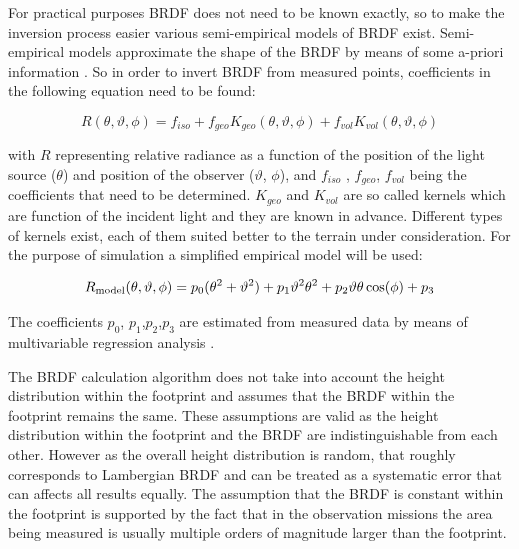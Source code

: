 For practical purposes \ac{BRDF} does not need to be known exactly, so to make the inversion process easier various semi-empirical models of \ac{BRDF} exist. Semi-empirical models approximate the shape of the \ac{BRDF} by means of some a-priori information \cite{BRDFwanner}. So in order to invert \ac{BRDF} from measured points, coefficients in the following equation need to be found:

\[
R(\theta ,\vartheta ,\phi ) = f_{iso}  + f_{geo} K_{geo} (\theta ,\vartheta ,\phi ) + f_{vol} K_{vol} (\theta ,\vartheta ,\phi )
\]


with $R$ representing relative radiance as a function of the position of the light source ($\theta$) and position of the observer ($\vartheta$, $\phi$), and $f_{iso}$  , $f_{geo}$, $f_{vol}$  being the coefficients that need to be determined. $K_{geo}$ and $K_{vol}$ are so called kernels which are function of the incident light and they are known in advance. Different types of kernels exist, each of them suited better to the terrain under consideration. 
For the purpose of simulation a simplified empirical model will be used:

\[
R_{{\rm{model}}} (\theta ,\vartheta ,\phi ){\rm{ }} = {\rm{ }}p_0 (\theta _{}^2  + \vartheta _{}^2 ) + p_1 \vartheta _{}^2 \theta _{}^2  + p_2 \vartheta \theta \cos (\phi ) + p_3 
\]

The coefficients $p_0$, $p_1$,$p_2$,$p_3$ are estimated from measured data by means of multivariable regression analysis \cite{BRDFrob}. 

The \ac{BRDF} calculation algorithm does not take into account the height distribution within the footprint and assumes that the \ac{BRDF} within the footprint remains the same. These assumptions are valid as the height distribution within the footprint and the \ac{BRDF} are indistinguishable from each other. However as the overall height distribution is random, that roughly corresponds to Lambergian \ac{BRDF} and can be treated as a systematic error that can affects all results equally. The assumption that the \ac{BRDF} is constant within the footprint is supported by the fact that in the observation missions the area being measured is usually multiple orders of magnitude larger than the footprint.



